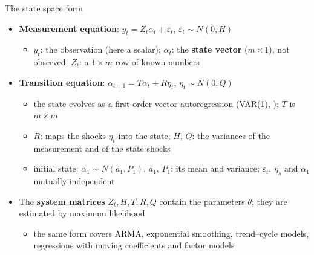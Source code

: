 \begin{frame}{The state space form}
\itemsize{\small}
\begin{itemize}
    \item \textbf{Measurement equation}: $y_t = Z_t\alpha_t + \varepsilon_t$, \quad $\varepsilon_t \sim N(0, H)$
    \begin{itemize}
        \item $y_t$: the observation (here a scalar); $\alpha_t$: the \textbf{state vector} ($m \times 1$), not observed; $Z_t$: a $1 \times m$ row of known numbers
    \end{itemize}
    \item \textbf{Transition equation}: $\alpha_{t+1} = T\alpha_t + R\eta_t$, \quad $\eta_t \sim N(0, Q)$
    \begin{itemize}
        \item the state evolves as a first-order vector autoregression (VAR(1), ); $T$ is $m \times m$
        \item $R$: maps the shocks $\eta_t$ into the state; $H$, $Q$: the variances of the measurement and of the state shocks
        \item initial state: $\alpha_1 \sim N(a_1, P_1)$, $a_1$, $P_1$: its mean and variance; $\varepsilon_t$, $\eta_s$ and $\alpha_1$ mutually independent
    \end{itemize}
    \item The \textbf{system matrices} $Z_t, H, T, R, Q$ contain the parameters $\theta$; they are estimated by maximum likelihood
    \begin{itemize}
        \item the same form covers ARMA, exponential smoothing, trend--cycle models, regressions with moving coefficients and factor models 
    \end{itemize}
\end{itemize}
\end{frame}

